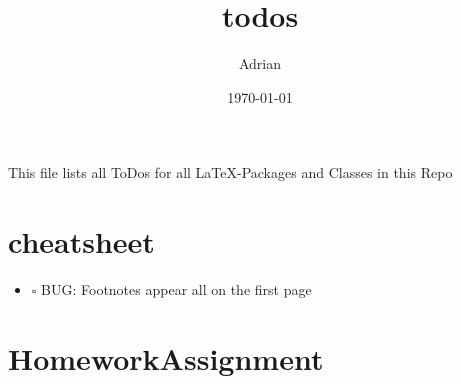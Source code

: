 \documentclass[11pt]{article}
\author{Adrian}
\date{\today}
\title{todos}
\begin{document}
\maketitle
\tableofcontents

This file lists all ToDos for all \LaTeX{}-Packages and Classes in this
 Repo


\section{cheatsheet}
\label{sec-1}
\begin{itemize}
\item $\square$ BUG: Footnotes appear all on the first page
\end{itemize}


\section{HomeworkAssignment}
\label{sec-2}
\end{document}
